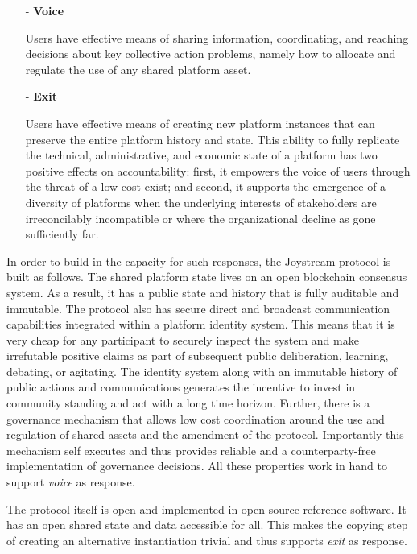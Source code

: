 \documentclass{article}
\begin{document}
\begin{itemize}

    \item[-] \textbf{Voice}

    Users have effective means of sharing information, coordinating, and reaching decisions about key collective action problems, namely how to allocate and regulate the use of any shared platform asset.

    \item[-] \textbf{Exit}

    Users have effective means of creating new platform instances that can preserve the entire platform history and state. This ability to fully replicate the technical, administrative, and economic state of a platform has two positive effects on accountability: first, it empowers the voice of users through the threat of a low cost exist; and second, it supports the emergence of a diversity of platforms when the underlying interests of stakeholders are irreconcilably incompatible or where the organizational decline as gone sufficiently far.

\end{itemize}

In order to build in the capacity for such responses, the Joystream protocol is built as follows. The shared platform state lives on an open blockchain consensus system. As a result, it has a public state and history that is fully auditable and immutable. The protocol also has secure direct and broadcast communication capabilities integrated within a platform identity system. This means that it is very cheap for any participant to securely inspect the system and make irrefutable positive claims as part of subsequent public deliberation, learning, debating, or agitating. The identity system along with an immutable history of public actions and communications generates the incentive to invest in community standing and act with a long time horizon. Further, there is a governance mechanism that allows low cost coordination around the use and regulation of shared assets and the amendment of the protocol. Importantly this mechanism self executes and thus provides reliable and a counterparty-free implementation of governance decisions. All these properties work in hand to support \textit{voice} as response.

The protocol itself is open and implemented in open source reference software. It has an open shared state and data accessible for all. This makes the copying step of creating an alternative instantiation trivial and thus supports \textit{exit} as response.
\end{document}
